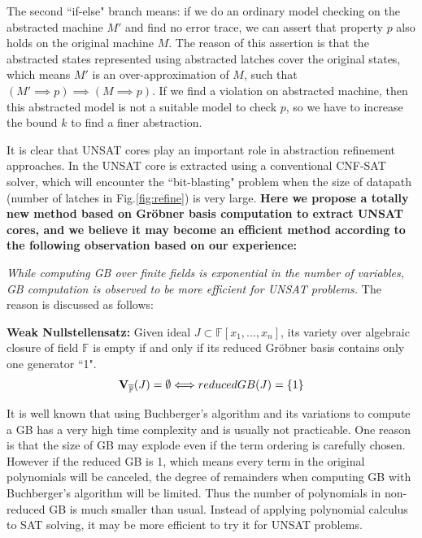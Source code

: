 The second ``if-else" branch means: if we do an ordinary model checking on the abstracted machine $M'$ and find no
error trace, we can assert that property $p$ also holds on the original machine $M$. The reason of this assertion is that
the abstracted states represented using abstracted latches cover the original states, which means $M'$ is an over-approximation
of $M$, such that $(M'\implies p) \implies (M\implies p)$. If we find a violation on abstracted machine, then this
abstracted model is not a suitable model to check $p$, so we have to increase the bound $k$ to find a finer abstraction.

It is clear that UNSAT cores play an important role in abstraction refinement approaches. In \cite{zhang2005design}
the UNSAT core is extracted using a conventional CNF-SAT solver, which will encounter the ``bit-blasting" problem
when the size of datapath (number of latches in Fig.\ref{fig:refine}) is very large. \textbf{Here we propose a totally new 
method based on Gr\"obner basis computation to extract UNSAT cores, and we believe it may become an efficient 
method according to the following observation based on our experience:}

{\it While computing GB over finite fields is exponential in the number of variables, GB  computation 
is observed to be more efficient for UNSAT problems.} 
The reason is discussed as follows:
\begin{Theorem}
{\bf Weak Nullstellensatz:} Given ideal $J\subset \mathbb F[x_1,\dots,x_n]$, its variety over algebraic closure
of field $\mathbb F$ is empty if and only if its reduced Gr\"obner basis contains only one generator ``1".
$${\bf V}_{\overline{\mathbb F}}(J) = \emptyset \Longleftrightarrow reducedGB(J) = \{1\}$$
\end{Theorem}
It is well known that using Buchberger's algorithm and its variations to compute a GB has a very high
time complexity and is usually not practicable. One reason is that the size of GB may explode even if the term
ordering is carefully chosen. However if the reduced GB is 1, which means every term in the original polynomials
will be canceled, the degree of remainders when computing GB with Buchberger's algorithm will be limited. 
Thus the number of polynomials in non-reduced GB is much smaller than usual.
Instead of applying polynomial calculus to SAT solving, it may be more efficient to try it for UNSAT
problems.

